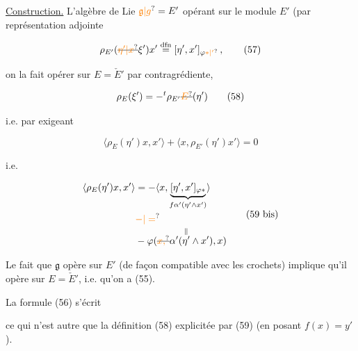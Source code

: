 \uline{Construction.} L'algèbre de Lie  $\unsure{\mathfrak g|g}=E'$ opérant sur le module $E'$ (par représentation adjointe

\[
\rho_{E'}(\deleted{\unsure{\eta'|x}}\xi')x'\overset{\mathrm{dfn}}{=}[\eta',x']_{\varphi\unsure{*|'}}\,, \tag*{(57)}
\]

on la fait opérer sur $E=\check E'$ par contragrédiente,

\[
\rho_E(\xi')=-{}^t\rho_{E'}\deleted{\unsure{E}}(\eta') \tag*{(58)}
\]

i.e. par exigeant

\[
\langle\rho_E(\eta')x,x'\rangle+\langle x,\rho_{E'}(\eta')x'\rangle=0 \tag*{(59)}
\]

i.e.

\[
\begin{aligned}
\langle\rho_E(\eta')x,x'\rangle
&=-\langle x,\underbrace{[\eta',x']_{\varphi *}}_{f\alpha'(\eta'\wedge x')}\rangle\\
&\unsure{-|=}\\[-.5ex]
&-\varphi(\deleted{\unsure{x,}}\alpha'(\overset{\Vert}{\eta'}\wedge x'),x)
\end{aligned}
\tag*{(59 bis)}
\]

Le fait que $\mathfrak g$ opère sur $E'$ (de façon compatible avec les crochets) implique qu'il opère sur $E=\check E'$, i.e. qu'on a (55).

La formule (56) s'écrit 

ce qui n'est autre que la définition (58) explicitée par (59) (en posant $f(x)=y'$).



